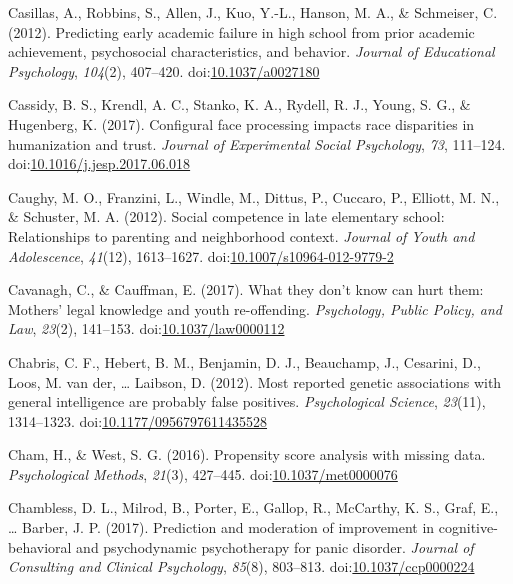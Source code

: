 \documentclass[english,man]{apa6}
\theoremstyle{definition}
\theoremstyle{definition}
\theoremstyle{definition}
\theoremstyle{remark}
\begin{document}
\hypertarget{ref-Casillas2012}{}
Casillas, A., Robbins, S., Allen, J., Kuo, Y.-L., Hanson, M. A., \&
Schmeiser, C. (2012). Predicting early academic failure in high school
from prior academic achievement, psychosocial characteristics, and
behavior. \emph{Journal of Educational Psychology}, \emph{104}(2),
407--420. doi:\href{https://doi.org/10.1037/a0027180}{10.1037/a0027180}

\hypertarget{ref-Cassidy2017}{}
Cassidy, B. S., Krendl, A. C., Stanko, K. A., Rydell, R. J., Young, S.
G., \& Hugenberg, K. (2017). Configural face processing impacts race
disparities in humanization and trust. \emph{Journal of Experimental
Social Psychology}, \emph{73}, 111--124.
doi:\href{https://doi.org/10.1016/j.jesp.2017.06.018}{10.1016/j.jesp.2017.06.018}

\hypertarget{ref-Caughy2012}{}
Caughy, M. O., Franzini, L., Windle, M., Dittus, P., Cuccaro, P.,
Elliott, M. N., \& Schuster, M. A. (2012). Social competence in late
elementary school: Relationships to parenting and neighborhood context.
\emph{Journal of Youth and Adolescence}, \emph{41}(12), 1613--1627.
doi:\href{https://doi.org/10.1007/s10964-012-9779-2}{10.1007/s10964-012-9779-2}

\hypertarget{ref-Cavanagh2017}{}
Cavanagh, C., \& Cauffman, E. (2017). What they don't know can hurt
them: Mothers' legal knowledge and youth re-offending. \emph{Psychology,
Public Policy, and Law}, \emph{23}(2), 141--153.
doi:\href{https://doi.org/10.1037/law0000112}{10.1037/law0000112}

\hypertarget{ref-Chabris2012}{}
Chabris, C. F., Hebert, B. M., Benjamin, D. J., Beauchamp, J., Cesarini,
D., Loos, M. van der, \ldots{} Laibson, D. (2012). Most reported genetic
associations with general intelligence are probably false positives.
\emph{Psychological Science}, \emph{23}(11), 1314--1323.
doi:\href{https://doi.org/10.1177/0956797611435528}{10.1177/0956797611435528}

\hypertarget{ref-Cham2016}{}
Cham, H., \& West, S. G. (2016). Propensity score analysis with missing
data. \emph{Psychological Methods}, \emph{21}(3), 427--445.
doi:\href{https://doi.org/10.1037/met0000076}{10.1037/met0000076}

\hypertarget{ref-Chambless2017a}{}
Chambless, D. L., Milrod, B., Porter, E., Gallop, R., McCarthy, K. S.,
Graf, E., \ldots{} Barber, J. P. (2017). Prediction and moderation of
improvement in cognitive-behavioral and psychodynamic psychotherapy for
panic disorder. \emph{Journal of Consulting and Clinical Psychology},
\emph{85}(8), 803--813.
doi:\href{https://doi.org/10.1037/ccp0000224}{10.1037/ccp0000224}
\end{document}
